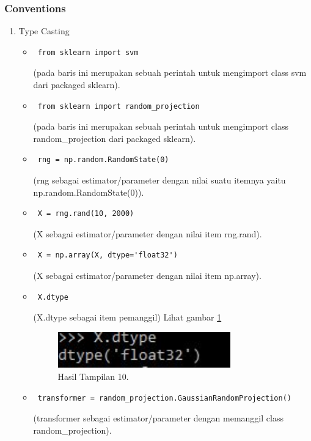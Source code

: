 \subsubsection{Conventions}
\begin{enumerate}
\item Type Casting
\begin{itemize}
\item\begin{verbatim} from sklearn import svm\end{verbatim}(pada baris ini merupakan sebuah perintah untuk mengimport class svm dari packaged sklearn).
\item\begin{verbatim} from sklearn import random_projection\end{verbatim}(pada baris ini merupakan sebuah perintah untuk mengimport class random\_projection dari packaged sklearn).
\item\begin{verbatim} rng = np.random.RandomState(0)\end{verbatim}(rng sebagai estimator/parameter dengan nilai suatu itemnya yaitu np.random.RandomState(0)).
\item\begin{verbatim} X = rng.rand(10, 2000)\end{verbatim}(X sebagai estimator/parameter dengan nilai item rng.rand).
\item\begin{verbatim} X = np.array(X, dtype='float32')\end{verbatim}(X sebagai estimator/parameter dengan nilai item np.array).
\item\begin{verbatim} X.dtype\end{verbatim}(X.dtype sebagai item pemanggil) Lihat gambar \ref{19}
\begin{figure}[!htbp]\centerline{\includegraphics[width=0.75\textwidth]{figures/huda/19.JPG}}\caption{Hasil Tampilan 10.}\label{19}\end{figure}
\item\begin{verbatim} transformer = random_projection.GaussianRandomProjection()\end{verbatim}(transformer sebagai estimator/parameter dengan memanggil class random\_projection).

\end{itemize}
\end{enumerate}
